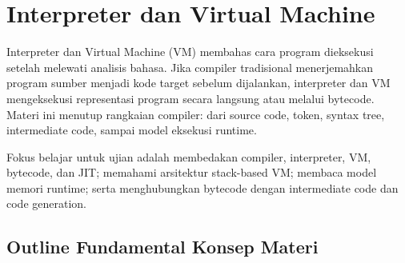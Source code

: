\section{Interpreter dan Virtual Machine}

Interpreter dan Virtual Machine (VM) membahas cara program dieksekusi setelah melewati analisis bahasa. Jika compiler tradisional menerjemahkan program sumber menjadi kode target sebelum dijalankan, interpreter dan VM mengeksekusi representasi program secara langsung atau melalui bytecode. Materi ini menutup rangkaian compiler: dari source code, token, syntax tree, intermediate code, sampai model eksekusi runtime.

Fokus belajar untuk ujian adalah membedakan compiler, interpreter, VM, bytecode, dan JIT; memahami arsitektur stack-based VM; membaca model memori runtime; serta menghubungkan bytecode dengan intermediate code dan code generation.

\subsection{Outline Fundamental Konsep Materi}

